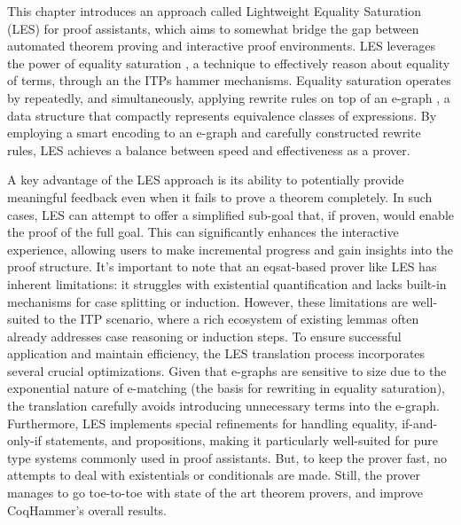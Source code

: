 This chapter introduces an approach called Lightweight Equality Saturation (LES) for proof assistants, which aims to somewhat bridge the gap between automated theorem proving and interactive proof environments. 
LES leverages the power of equality saturation \cite{eqsat}, a technique to effectively reason about equality of terms, through an the ITPs hammer mechanisms.
Equality saturation operates by repeatedly, and simultaneously, applying rewrite rules on top of an e-graph \cite{egg}, a data structure that compactly represents equivalence classes of expressions. 
By employing a smart encoding to an e-graph and carefully constructed rewrite rules, LES achieves a balance between speed and effectiveness as a prover.

A key advantage of the LES approach is its ability to potentially provide meaningful feedback even when it fails to prove a theorem completely. 
In such cases, LES can attempt to offer a simplified sub-goal that, if proven, would enable the proof of the full goal. 
This can significantly enhances the interactive experience, allowing users to make incremental progress and gain insights into the proof structure. 
It's important to note that an eqsat-based prover like LES has inherent limitations: it struggles with existential quantification and lacks built-in mechanisms for case splitting or induction. 
However, these limitations are well-suited to the ITP scenario, where a rich ecosystem of existing lemmas often already addresses case reasoning or induction steps.
To ensure successful application and maintain efficiency, the LES translation process incorporates several crucial optimizations. 
Given that e-graphs are sensitive to size due to the exponential nature of e-matching (the basis for rewriting in equality saturation), the translation carefully avoids introducing unnecessary terms into the e-graph. 
Furthermore, LES implements special refinements for handling equality, if-and-only-if statements, and propositions, making it particularly well-suited for pure type systems commonly used in proof assistants.
But, to keep the prover fast, no attempts to deal with existentials or conditionals are made.
Still, the prover manages to go toe-to-toe with state of the art theorem provers, and improve CoqHammer's overall results.

